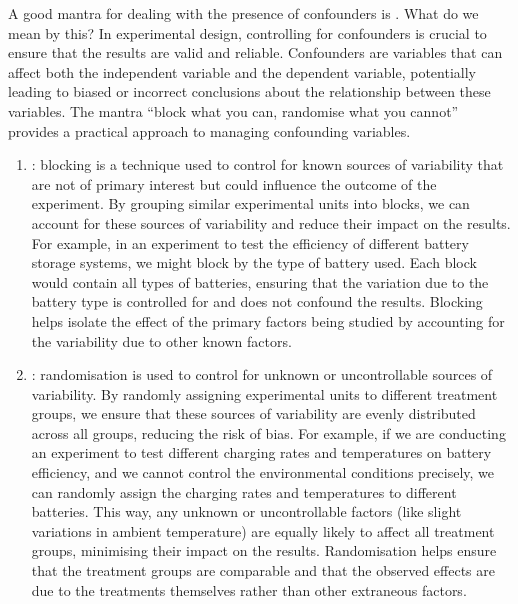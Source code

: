 \documentclass[letterpaper,10pt,english]{jupyterBook}
\begin{document}
\sphinxAtStartPar
A good mantra for dealing with the presence of confounders is . What do we mean by this? In experimental design, controlling for confounders is crucial to ensure that the results are valid and reliable. Confounders are variables that can affect both the independent variable and the dependent variable, potentially leading to biased or incorrect conclusions about the relationship between these variables. The mantra “block what you can, randomise what you cannot” provides a practical approach to managing confounding variables.
\begin{enumerate}
%
\item {} 
\sphinxAtStartPar
{}: blocking is a technique used to control for known sources of variability that are not of primary interest but could influence the outcome of the experiment. By grouping similar experimental units into blocks, we can account for these sources of variability and reduce their impact on the results. For example, in an experiment to test the efficiency of different battery storage systems, we might block by the type of battery used. Each block would contain all types of batteries, ensuring that the variation due to the battery type is controlled for and does not confound the results. Blocking helps isolate the effect of the primary factors being studied by accounting for the variability due to other known factors.

\item {} 
\sphinxAtStartPar
{}: randomisation is used to control for unknown or uncontrollable sources of variability. By randomly assigning experimental units to different treatment groups, we ensure that these sources of variability are evenly distributed across all groups, reducing the risk of bias. For example, if we are conducting an experiment to test different charging rates and temperatures on battery efficiency, and we cannot control the environmental conditions precisely, we can randomly assign the charging rates and temperatures to different batteries. This way, any unknown or uncontrollable factors (like slight variations in ambient temperature) are equally likely to affect all treatment groups, minimising their impact on the results. Randomisation helps ensure that the treatment groups are comparable and that the observed effects are due to the treatments themselves rather than other extraneous factors.

\end{enumerate}
\end{document}
